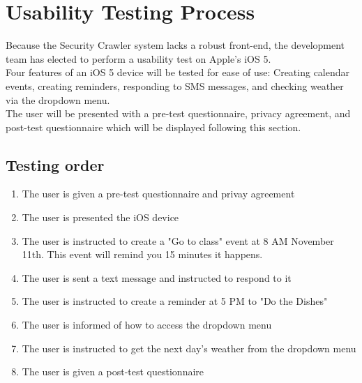 \section{Usability Testing Process}
Because the Security Crawler system lacks a robust front-end, the development team has elected to perform a usability test on Apple's iOS 5. \\
Four features of an iOS 5 device will be tested for ease of use:  Creating calendar events, creating reminders, responding to SMS messages, and checking weather via the dropdown menu.\\
The user will be presented with a pre-test questionnaire, privacy agreement, and post-test questionnaire which will be displayed following this section.

\subsection{Testing order}
\begin{enumerate}
\item The user is given a pre-test questionnaire and privay agreement
\item The user is presented the iOS device
\item The user is instructed to create a "Go to class" event at 8 AM November 11th.  This event will remind you 15 minutes it happens.
\item The user is sent a text message and instructed to respond to it
\item The user is instructed to create a reminder at 5 PM to "Do the Dishes"
\item The user is informed of how to access the dropdown menu
\item The user is instructed to get the next day's weather from the dropdown menu
\item The user is given a post-test questionnaire
\end{enumerate}
